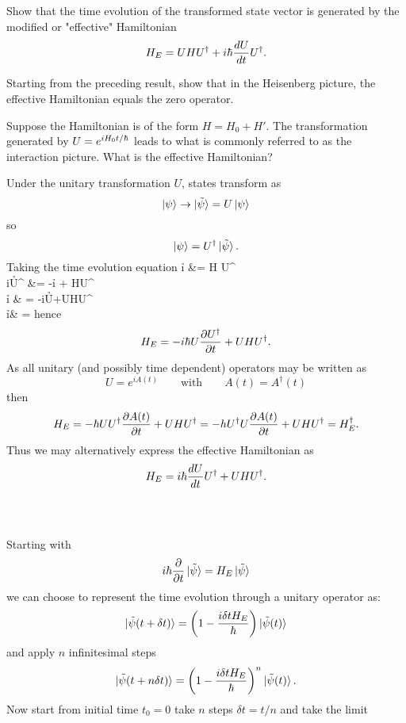 \documentclass[10pt,letterpaper]{article}
\begin{document}
	\benum
	\item
	Show that the time evolution of the transformed state vector is generated by the modified or 
	"effective" Hamiltonian
	\[
		H_E = UHU^\dag + i\h \diff[U]{t}U^\dag.
	\]
	
	\item
	Starting from the preceding result, show that in the Heisenberg picture, the effective Hamiltonian equals
	the zero operator.
	
	\item 
	Suppose the Hamiltonian is of the form $H = H_0+H'$. The transformation generated by $U = e^{iH_0t/\h}$
	leads to what is commonly referred to as the interaction picture. What is the effective Hamiltonian?
	\\
	\eenum
	\benum
	\item
	Under the unitary transformation $U$, states transform as
	\[
		\ket \psi \to \ket{\tilde\psi} = U\ket \psi
	\]
	so
	\[
		\ket \psi = U^\dag \ket{\tilde\psi}.
	\]
	Taking the time evolution equation
	\ba
		i\h {} &= H U^\dag\ket{\tilde\psi}\\
		i\h U^\dag {}\ket{\tilde\psi} &= -i\h {}\ket{\tilde\psi} + HU^\dag \ket{\tilde\psi}\\
		i\h{}\ket{\tilde\psi} & = -i\h U\ket{\tilde\psi}+UHU^\dag\ket{\tilde\psi}\\
		i\h{}\ket{\tilde\psi}& = \ket{\tilde\psi}
	\ea
	hence
	\[
		H_E = -i\h U\pdiff[U^\dag]{t}+UHU^\dag.
	\]
	As all unitary (and possibly time dependent) operators  may be written as 
	\[
		U= e^{iA(t)}\qquad\text{with}\qquad A(t)=A^\dag(t)
	\]
	then
	\[
		H_E = -\h UU^\dag \pdiff[A(t)]{t}+UHU^\dag = -hU^\dag U \pdiff[A(t)]{t}+UHU^\dag = H_E^\dag.
	\]
	Thus we may alternatively express the effective Hamiltonian as
	\[
		H_E = i\h \diff[U]{t}U^\dag + UHU^\dag.
	\]
	\\ \\
	\item 
	Starting with
	\[
		i\h\pdiff{t} \ket{\tilde\psi} = H_E\ket{\tilde\psi}
	\]
	we can choose to represent the time evolution through a unitary operator as:
	\[
		\ket{\tilde\psi(t+\delta t)} = \plr{1-\frac{i\delta tH_E}{\h}}\ket{\tilde\psi(t)}
	\]
	and apply $n$ infinitesimal steps
	\[
		\ket{\tilde\psi(t+n\delta t)} = \plr{1-\frac{i\delta tH_E}{\h}}^n\ket{\tilde\psi(t)}.
	\]
	Now start from initial time $t_0 = 0$ take $n$ steps $\delta t = t/n$ and take the limit
\end{document}
